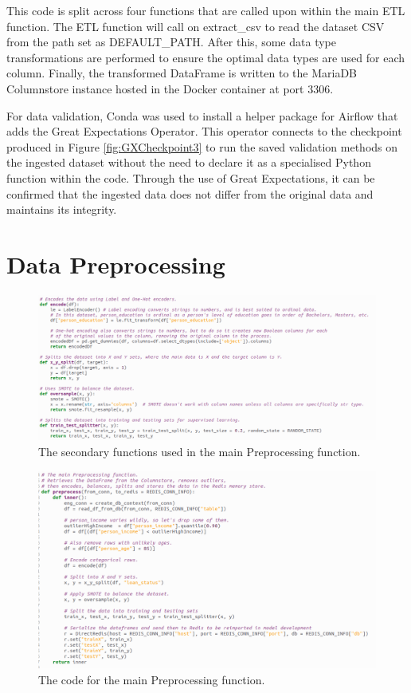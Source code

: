 \documentclass[12pt]{report}
\newcommand{\para}{\vspace{7pt}\noindent}
\begin{document}
\para This code is split across four functions that are called upon within the main 
ETL function. The ETL function will call on extract\_csv to read the dataset CSV from 
the path set as DEFAULT\_PATH. After this, some data type transformations are performed 
to ensure the optimal data types are used for each column. Finally, the transformed 
DataFrame is written to the MariaDB Columnstore instance hosted in the Docker 
container at port 3306.

\para For data validation,
Conda was used to install a helper package for Airflow that adds the Great Expectations Operator.
This operator connects to the checkpoint produced in Figure \ref{fig:GXCheckpoint3} to run the saved validation 
methods on the ingested dataset without the need to declare it as a specialised Python function within 
the code. Through the use of Great Expectations, it can be confirmed that the ingested data does not differ 
from the original data and maintains its integrity.

\section{Data Preprocessing}\label{sec:ImpPreprocessing}

\begin{figure}[H]
    \centering
    \includegraphics[width=\linewidth]{Implementation/.Code/PipelineFunctions/Preprocessing1.png}
    \caption{The secondary functions used in the main Preprocessing function.}
    \label{fig:PreprocessingCode1}
\end{figure}

\begin{figure}[H]
    \centering
    \includegraphics[width=\linewidth]{Implementation/.Code/PipelineFunctions/Preprocessing2.png}
    \caption{The code for the main Preprocessing function.}
    \label{fig:PreprocessingCode2}
\end{figure}
\end{document}
